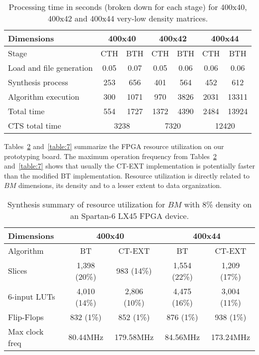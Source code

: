 \documentclass[letterpaper, twoside, openright, 12pt]{book}%
\begin{document}
	\begin{table}[htb]
	\caption{Processing time in seconds (broken down for each stage) for 400x40, 400x42 and 400x44 very-low density matrices.} \label{table:8}
	\begin{center}
	    \begin{tabular}{lcccccc}   \hline
	    	   Dimensions                & \multicolumn{2}{c}{400x40} & \multicolumn{2}{c}{400x42} 
	    	                             & \multicolumn{2}{c}{400x44} \\ \hline
	    	    	Stage	        			& CTH & BTH	& CTH & BTH & CTH & BTH \\ \hline
	    	    Load and file generation & 0.05& 0.07& 0.05& 0.06& 0.06& 0.06\\
	    	    Synthesis process        & 253 & 656 & 401 & 564 & 452 & 612\\
	    	    Algorithm execution      & 300 & 1071& 970 & 3826& 2031& 13311\\ \hline
	    	    Total time               & 554 & 1727& 1372& 4390& 2484& 13924\\ \hline
	    	    CTS total time               & \multicolumn{2}{c}{3238} & \multicolumn{2}{c}{7320} 
	    	    								& \multicolumn{2}{c}{12420}\\ \hline	    	    
	    \end{tabular}
	\end{center}
	\end{table}
	
	Tables~\ref{table:6} and~\ref{table:7} summarize the FPGA resource utilization on our prototyping board. The maximum operation frequency from Tables~\ref{table:6} and~\ref{table:7} shows that usually the CT-EXT implementation is potentially faster than the modified BT implementation. Resource utilization is directly related to $BM$ dimensions, its density and to a lesser extent to data organization.
	
	\begin{table}[htb]
	\caption{Synthesis summary of resource utilization for $BM$ with 8\% density on an Spartan-6 LX45 FPGA device.} \label{table:6}
	\begin{center}
	    \begin{tabular}{lcccc}   \hline
	    	    Dimensions & \multicolumn{2}{c}{400x40} & \multicolumn{2}{c}{400x44} \\ \hline
	    	    Algorithm & BT & CT-EXT & BT & CT-EXT \\ \hline
	        Slices & 1,398 (20\%) & 983 (14\%) & 1,554 (22\%) & 1,209 (17\%)  \\
	        6-input LUTs & 4,010 (14\%) & 2,806 (10\%)& 4,475 (16\%)  & 3,004 (11\%)\\
	        Flip-Flops & 832 (1\%) & 852 (1\%) & 876 (1\%) & 938 (1\%)\\
	        Max clock freq & 80.44MHz & 179.58MHz & 84.56MHz & 173.24MHz\\ \hline
	    \end{tabular}
	\end{center}
	\end{table}
	
\end{document}
